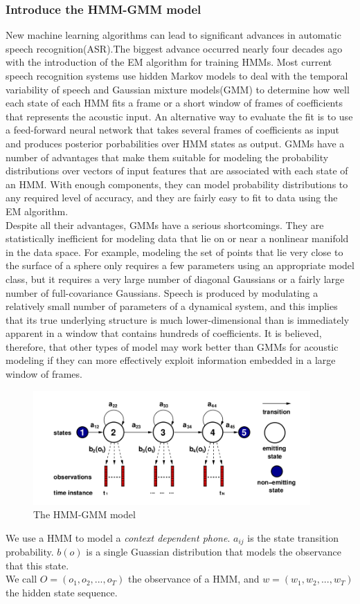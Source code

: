 \documentclass[11pt]{article}
\begin{document}
\subsubsection{Introduce the HMM-GMM model}
New machine learning algorithms can lead to significant advances in automatic speech recognition(ASR).The biggest advance occurred nearly four decades ago with the introduction of the EM algorithm for training HMMs\cite{HMM1}. Most current speech recognition systems\cite{DNN1} use hidden Markov models to deal with the temporal variability of speech and Gaussian mixture models(GMM) to determine how well each state of each HMM fits a frame or a short window of frames of coefficients that represents the acoustic input. An alternative way to evaluate the fit is to use a feed-forward neural network that takes several frames of coefficients as input and
produces posterior porbabilities over HMM states as output. GMMs have a number of advantages that make them suitable for modeling the probability distributions over vectors of input features that are associated with each state of an HMM. With enough components, they can model probability distributions to any required level of accuracy, and they are fairly easy to fit to data using the EM algorithm. \\
Despite all their advantages, GMMs have a serious shortcomings. They are statistically\cite{HMM2} inefficient for modeling data that lie on or near a nonlinear manifold in the data space. For example, modeling the set of points that lie very close to the surface of a sphere only requires a few parameters using an appropriate model class, but it requires a very large number of diagonal Gaussians or a fairly large number of full-covariance Gaussians. Speech is produced by modulating a relatively small number of parameters of a dynamical system, and this implies that its true underlying structure is much lower-dimensional than is immediately apparent in a window that contains hundreds of coefficients. It is believed, therefore, that other types of model may work better than GMMs for acoustic modeling if they can more effectively exploit information embedded in a large window of frames.\\
\begin{figure}
\centering
\includegraphics[width=300pt]{HMM.png}
\caption{The HMM-GMM model}
\end{figure}
We use a HMM to model a \emph{context dependent phone}. $a_{ij}$ is the state transition probability. $b(o)$ is a single Guassian distribution that models the observance that this state.\\
We call $O=(o_1,o_2,...,o_T)$ the observance of a HMM, and $w = (w_1,w_2,...,w_T)$ the hidden state sequence.
\end{document}
